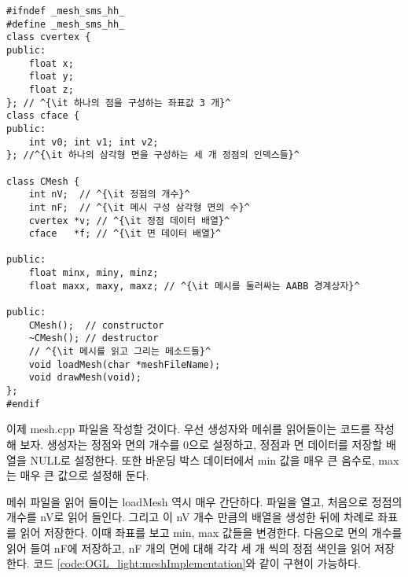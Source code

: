 \begin{algorithmbis}[메시 클래스 정의]\label{code:OGL_light:meshClass}
\lstset{language=C++, escapechar=^} 
\begin{lstlisting}
#ifndef _mesh_sms_hh_
#define _mesh_sms_hh_
class cvertex {
public:
    float x;
    float y;
    float z;
}; // ^{\it 하나의 점을 구성하는 좌표값 3 개}^
class cface {
public:
    int v0; int v1; int v2;
}; //^{\it 하나의 삼각형 면을 구성하는 세 개 정점의 인덱스들}^

class CMesh {
    int nV;  // ^{\it 정점의 개수}^
    int nF;  // ^{\it 메시 구성 삼각형 면의 수}^
    cvertex *v; // ^{\it 정점 데이터 배열}^
    cface   *f; // ^{\it 면 데이터 배열}^

public:
    float minx, miny, minz;
    float maxx, maxy, maxz; // ^{\it 메시를 둘러싸는 AABB 경계상자}^

public:
    CMesh();  // constructor
    ~CMesh(); // destructor
    // ^{\it 메시를 읽고 그리는 메소드들}^
    void loadMesh(char *meshFileName);
    void drawMesh(void);
};
#endif
\end{lstlisting}
\end{algorithmbis}

이제 {\sf mesh.cpp} 파일을 작성할 것이다. 우선 생성자와 메쉬를 읽어들이는 코드를 작성해 보자. 생성자는 정점와 면의 개수를 0으로 설정하고, 정점과 면 데이터를 저장할 배열을 {\sf NULL}로 설정한다. 또한 바운딩 박스 데이터에서 {\sf min} 값을 매우 큰 음수로, {\sf max}는 매우 큰 값으로 설정해 둔다.

메쉬 파일을 읽어 들이는 {\sf loadMesh} 역시 매우 간단하다. 파일을 열고, 처음으로 정점의 개수를 {\sf nV}로 읽어 들인다. 
그리고 이 {\sf nV} 개수 만큼의 배열을 생성한 뒤에 차례로 좌표를 읽어 저장한다. 이때 좌표를 보고 {\sf min, max} 값들을 변경한다. 
다음으로 면의 개수를 읽어 들여 {\sf nF}에 저장하고, {\sf nF} 개의 면에 대해 각각 세 개 씩의 정점 색인을 읽어 저장한다.
코드 \ref{code:OGL_light:meshImplementation}와 같이 구현이 가능하다.

